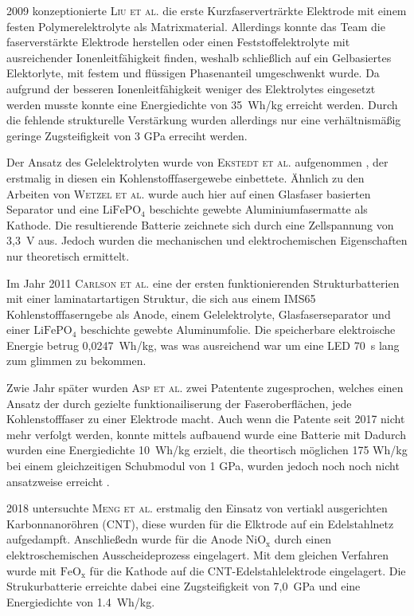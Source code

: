 2009 konzeptionierte \textsc{Liu et al.} \cite{Liu2009} die erste Kurzfaserverträrkte Elektrode mit einem festen Polymerelektrolyte als Matrixmaterial. Allerdings konnte das Team die faserverstärkte Elektrode herstellen oder einen Feststoffelektrolyte mit ausreichender Ionenleitfähigkeit finden, weshalb schließlich auf ein Gelbasiertes Elektorlyte, mit festem und flüssigen Phasenanteil umgeschwenkt wurde. Da aufgrund der besseren Ionenleitfähigkeit weniger des Elektrolytes eingesetzt werden musste konnte eine Energiedichte von 35~Wh/kg erreicht werden.  Durch die fehlende strukturelle Verstärkung wurden allerdings nur eine verhältnismäßig geringe Zugsteifigkeit von 3 GPa erreciht werden.

Der Ansatz des Gelelektrolyten wurde von \textsc{Ekstedt et al.} aufgenommen \cite{Ekstedt2010}, der erstmalig in diesen ein Kohlenstofffasergewebe einbettete. Ähnlich zu den Arbeiten von \textsc{Wetzel et al.} wurde auch hier auf einen Glasfaser basierten Separator und eine $\text{LiFePO}_\text{4}$ beschichte gewebte Aluminiumfasermatte als Kathode. Die resultierende Batterie zeichnete sich durch eine Zellspannung von 3,3~V aus. Jedoch wurden die mechanischen und elektrochemischen Eigenschaften nur theoretisch ermittelt.

Im Jahr 2011 \textsc{Carlson et al.} \cite{Carlson2011} eine der ersten funktionierenden Strukturbatterien mit einer laminatartartigen Struktur, die sich aus einem IMS65 Kohlenstofffaserngebe als Anode, einem Gelelektrolyte, Glasfaserseparator und einer  $\text{LiFePO}_\text{4}$ beschichte gewebte Aluminumfolie. Die speicherbare elektroische Energie betrug 0,0247~Wh/kg, was  was ausreichend war um eine LED 70~s lang zum glimmen zu bekommen.

Zwie Jahr später wurden \textsc{Asp et al.} \cite{Asp2013US,Asp2013CN} zwei Patentente zugesprochen, welches einen Ansatz der durch gezielte funktionailiserung der Faseroberflächen, jede Kohlenstofffaser zu einer Elektrode macht. Auch wenn die Patente seit 2017 nicht mehr verfolgt werden, konnte mittels aufbauend wurde eine Batterie mit 
Dadurch wurden eine Energiedichte 10~Wh/kg erzielt, die theortisch möglichen 175 Wh/kg bei einem gleichzeitigen Schubmodul von 1 GPa, wurden jedoch noch noch nicht ansatzweise erreicht \cite{Leijonmarck2013, Carlson2013}.

2018 untersuchte \textsc{Meng et al.} \cite{Meng2018} erstmalig den Einsatz von vertiakl ausgerichten Karbonnanoröhren (CNT), diese wurden für die Elktrode auf ein Edelstahlnetz aufgedampft. Anschließedn wurde für die Anode $\text{NiO}_\text{x}$ durch einen elektroschemischen Ausscheideprozess eingelagert. Mit dem gleichen Verfahren wurde mit $\text{FeO}_\text{x}$ für die Kathode auf die CNT-Edelstahlelektrode eingelagert. Die Strukurbatterie erreichte dabei eine Zugsteifigkeit von 7,0~GPa und eine Energiedichte von 1.4~Wh/kg.

